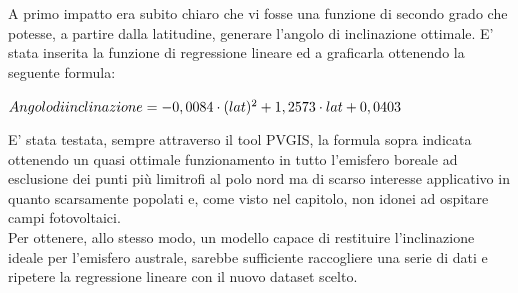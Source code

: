A primo impatto era subito chiaro che vi fosse una funzione di secondo grado che potesse, a partire dalla latitudine, generare l'angolo di inclinazione ottimale. E' stata inserita la funzione di regressione lineare ed a graficarla ottenendo la seguente formula:
\begin{center}
    {\large$Angolo\space di\space inclinazione = -0,0084 \cdot (lat)^2 + 1,2573\cdot lat + 0,0403$}
\end{center}
\noindent
E' stata testata, sempre attraverso il tool PVGIS, la formula sopra indicata ottenendo un quasi ottimale funzionamento in tutto l'emisfero boreale ad esclusione dei punti più limitrofi al polo nord ma di scarso interesse applicativo in quanto scarsamente popolati e, come visto nel capitolo, non idonei ad ospitare campi fotovoltaici.\\
Per ottenere, allo stesso modo, un modello capace di restituire l'inclinazione ideale per l'emisfero australe, sarebbe sufficiente raccogliere una serie di dati e ripetere la regressione lineare con il nuovo dataset scelto.